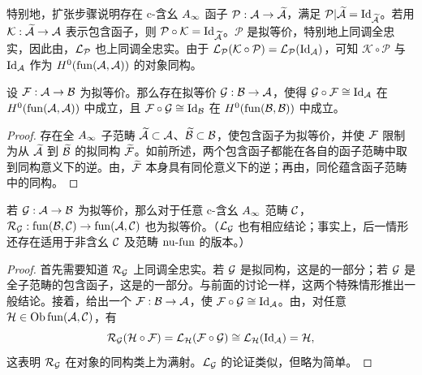 特别地，扩张步骤说明存在 c-含幺 $\Ai$ 函子 $\mathcal P:\A\to\widetilde{\A}$，满足 $\mathcal P|\widetilde{\A}=\Id_{\widetilde{\A}}$。若用 $\mathcal K:\widetilde{\A}\to\A$ 表示包含函子，则 $\mathcal P\circ\mathcal K=\Id_{\widetilde{\A}}$。$\mathcal P$ 是拟等价，特别地上同调全忠实，因此由，$\LG_{\mathcal P}$ 也上同调全忠实。由于 $\LG_{\mathcal P}(\mathcal K\circ\mathcal P)=\LG_{\mathcal P}(\Id_{\A})$，可知 $\mathcal K\circ\mathcal P$ 与 $\Id_{\A}$ 作为 $H^0(\operatorname{fun}(\A,\A))$ 的对象同构。

\begin{theorem}\label{st:2.9}
设 $\F:\A\to\B$ 为拟等价。那么存在拟等价 $\G:\B\to\A$，使得 $\G\circ\F\cong\Id_{\A}$ 在 $H^0(\operatorname{fun}(\A,\A))$ 中成立，且 $\F\circ\G\cong\Id_{\B}$ 在 $H^0(\operatorname{fun}(\B,\B))$ 中成立。
\end{theorem}
\begin{proof}
存在全 $\Ai$ 子范畴 $\widetilde{\A}\subset\A$、$\widetilde{\B}\subset\B$，使包含函子为拟等价，并使 $\F$ 限制为从 $\widetilde{\A}$ 到 $\widetilde{\B}$ 的拟同构 $\widetilde{\F}$。如前所述，两个包含函子都能在各自的函子范畴中取到同构意义下的逆。由，$\widetilde{\F}$ 本身具有同伦意义下的逆；再由，同伦蕴含函子范畴中的同构。
\end{proof}

\begin{lemma}\label{st:2.10}
若 $\G:\A\to\B$ 为拟等价，那么对于任意 c-含幺 $\Ai$ 范畴 $\C$，$\RG_{\G}:\operatorname{fun}(\B,\C)\to\operatorname{fun}(\A,\C)$ 也为拟等价。（$\LG_{\G}$ 也有相应结论；事实上，后一情形还存在适用于非含幺 $\C$ 及范畴 $\nufun$ 的版本。）
\end{lemma}
\begin{proof}
首先需要知道 $\RG_{\G}$ 上同调全忠实。若 $\G$ 是拟同构，这是的一部分；若 $\G$ 是全子范畴的包含函子，这是的一部分。与前面的讨论一样，这两个特殊情形推出一般结论。接着，给出一个 $\F:\B\to\A$，使 $\F\circ\G\cong\Id_{\A}$。由，对任意 $\mathcal H\in\Ob\operatorname{fun}(\A,\C)$，有
\[
\RG_{\G}(\mathcal H\circ\F)=\LG_{\mathcal H}(\F\circ\G)
\cong\LG_{\mathcal H}(\Id_{\A})=\mathcal H,
\]
这表明 $\RG_{\G}$ 在对象的同构类上为满射。$\LG_{\G}$ 的论证类似，但略为简单。
\end{proof}

